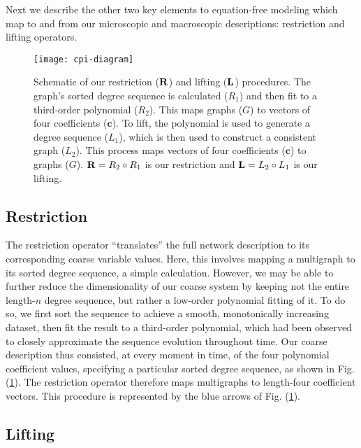   Next we describe the other two key elements to equation-free
  modeling which map to and from our microscopic and macroscopic
  descriptions: restriction and lifting operators.

  \begin{figure}
    \centering
    \texttt{[image: cpi-diagram]}
    \caption[Schematic of multigraph's lifting and restricting
    procedures]{Schematic of our restriction ($\mathbf{R}$) and
      lifting ($\mathbf{L}$) procedures. The graph's sorted degree
      sequence is calculated ($R_1$) and then fit to a third-order
      polynomial ($R_2$). This maps graphs ($G$) to vectors of four
      coefficients ($\mathbf{c}$). To lift, the polynomial is used to
      generate a degree sequence ($L_1$), which is then used to
      construct a consistent graph ($L_2$). This process maps vectors
      of four coefficients ($\mathbf{c}$) to graphs ($G$).
      $\mathbf{R} = R_2 \circ R_1 $ is our restriction and
      $\mathbf{L} = L_2 \circ L_1$ is our
      lifting. \label{fig:cpi-diagram}}
  \end{figure}


  \subsection{Restriction}

  The restriction operator ``translates'' the full network description
  to its corresponding coarse variable values.
  Here, this involves mapping a multigraph to its sorted degree
  sequence, a simple calculation.
  However, we may be able to further reduce the dimensionality of our
  coarse system by keeping not the entire length-$n$ degree sequence,
  but rather a low-order polynomial fitting of it.
  To do so, we first sort the sequence to achieve a smooth,
  monotonically increasing dataset, then fit the result to a
  third-order polynomial, which had been observed to closely
  approximate the sequence evolution throughout time.
  Our coarse description thus consisted, at every moment in time, of
  the four polynomial coefficient values, specifying a particular
  sorted degree sequence, as shown in Fig. (\ref{fig:cpi-diagram}).
  The restriction operator therefore maps multigraphs to length-four
  coefficient vectors.
  This procedure is represented by the blue arrows of
  Fig. (\ref{fig:cpi-diagram}).

  \subsection{Lifting}

